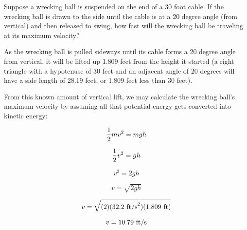

Suppose a wrecking ball is suspended on the end of a 30 foot cable.  If the wrecking ball is drawn to the side until the cable is at a 20 degree angle (from vertical) and then released to swing, how fast will the wrecking ball be traveling at its maximum velocity?







As the wrecking ball is pulled sideways until its cable forms a 20 degree angle from vertical, it will be lifted up 1.809 feet from the height it started (a right triangle with a hypotenuse of 30 feet and an adjacent angle of 20 degrees will have a side length of 28.19 feet, or 1.809 feet less than 30 feet).

\vskip 10pt

From this known amount of vertical lift, we may calculate the wrecking ball's maximum velocity by assuming all that potential energy gets converted into kinetic energy:

$${1 \over 2}mv^2 = mgh$$

$${1 \over 2}v^2 = gh$$

$$v^2 = 2gh$$

$$v = \sqrt{2 g h}$$

$$v = \sqrt{(2) (32.2 \hbox{ ft/s}^2)  (1.809 \hbox{ ft})}$$

$$v = 10.79 \hbox{ ft/s}$$











